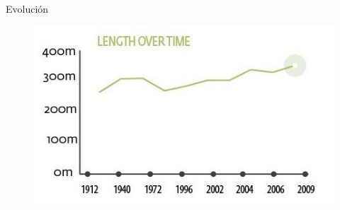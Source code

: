 \documentclass{beamer}
\begin{document}
\begin{frame}{Evolución }

\begin{figure}
	\includegraphics[scale=0.5]{lenght}
\end{figure}

\end{frame}	
\end{document}
